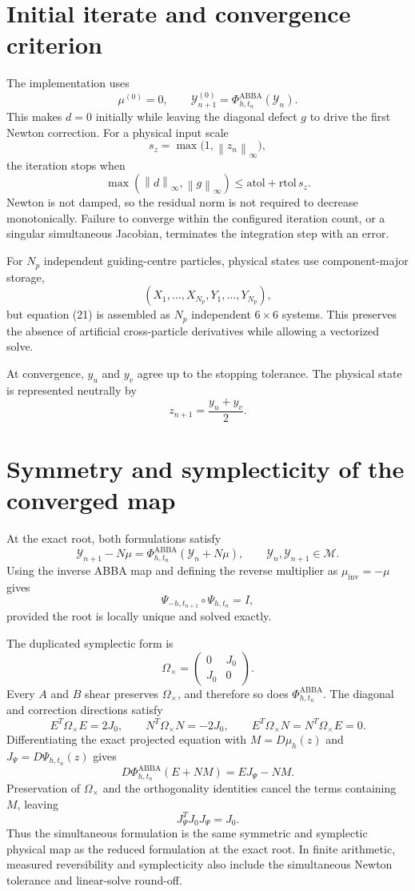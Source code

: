 \documentclass[11pt,a4paper]{article}
\newcommand{\Id}{I}
\newcommand{\Y}{\mathcal{Y}}
\newcommand{\M}{\mathcal{M}}
\newcommand{\Om}{\Omega_{\times}}
\newcommand{\PhiAB}{\Phi^{\mathrm{ABBA}}_{h,t_n}}
\newcommand{\norm}[1]{\left\lVert #1\right\rVert}
\begin{document}
\section{Initial iterate and convergence criterion}

The implementation uses
\[
 \mu^{(0)}=0,
 \qquad
 \Y_{n+1}^{(0)}=\PhiAB(\Y_n).
\]
This makes $d=0$ initially while leaving the diagonal defect $g$ to drive the first
Newton correction. For a physical input scale
\[
 s_z=\max\bigl(1,\norm{z_n}_\infty\bigr),
\]
the iteration stops when
\[
 \max\left(\norm{d}_\infty,\norm{g}_\infty\right)
 \leq \text{atol}+\text{rtol}\,s_z.
\]
Newton is not damped, so the residual norm is not required to decrease monotonically.
Failure to converge within the configured iteration count, or a singular simultaneous
Jacobian, terminates the integration step with an error.

For $N_p$ independent guiding-centre particles, physical states use component-major
storage,
\[
 (X_1,\ldots,X_{N_p},Y_1,\ldots,Y_{N_p}),
\]
but equation (21) is assembled as $N_p$ independent $6\times6$ systems. This preserves
the absence of artificial cross-particle derivatives while allowing a vectorized solve.

At convergence, $y_u$ and $y_v$ agree up to the stopping tolerance. The physical state is
represented neutrally by
\[
 z_{n+1}=\frac{y_u+y_v}{2}.
\]

\section{Symmetry and symplecticity of the converged map}

At the exact root, both formulations satisfy
\[
 \Y_{n+1}-N\mu
 =\Phi^{\mathrm{ABBA}}_{h,t_n}(\Y_n+N\mu),
 \qquad
 \Y_n,\Y_{n+1}\in\M.
\]
Using the inverse ABBA map and defining the reverse multiplier as
$\mu_{\mathrm{inv}}=-\mu$ gives
\[
 \Psi_{-h,t_{n+1}}\circ\Psi_{h,t_n}=\Id,
\]
provided the root is locally unique and solved exactly.

The duplicated symplectic form is
\[
 \Om=
 \begin{pmatrix}
  0&J_0\\
  J_0&0
 \end{pmatrix}.
\]
Every $A$ and $B$ shear preserves $\Om$, and therefore so does $\PhiAB$. The
diagonal and correction directions satisfy
\[
 E^T\Om E=2J_0,
 \qquad
 N^T\Om N=-2J_0,
 \qquad
 E^T\Om N=N^T\Om E=0.
\]
Differentiating the exact projected equation with
$M=D\mu_h(z)$ and $J_\Psi=D\Psi_{h,t_n}(z)$ gives
\[
 D\PhiAB(E+NM)=EJ_\Psi-NM.
\]
Preservation of $\Om$ and the orthogonality identities cancel the terms containing
$M$, leaving
\[
 \boxed{J_\Psi^TJ_0J_\Psi=J_0.}
\]
Thus the simultaneous formulation is the same symmetric and symplectic physical
map as the reduced formulation at the exact root. In finite arithmetic, measured reversibility and symplecticity
also include the simultaneous Newton tolerance and linear-solve round-off.
\end{document}
